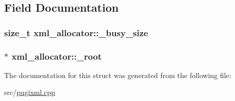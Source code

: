 \subsection{Field Documentation}
\hypertarget{structxml__allocator_a4908b4aaa8cbbc3bf936ab8a938053c0}{
\subsubsection[{\_\-busy\_\-size}]{\setlength{\rightskip}{0pt plus 5cm}size\_\-t {\bf xml\_\-allocator::\_\-busy\_\-size}}}
\label{structxml__allocator_a4908b4aaa8cbbc3bf936ab8a938053c0}
\hypertarget{structxml__allocator_a38082e85b23743620a257f997a00bb69}{
\subsubsection[{\_\-root}]{$\ast$ {\bf xml\_\-allocator::\_\-root}}}
\label{structxml__allocator_a38082e85b23743620a257f997a00bb69}


The documentation for this struct was generated from the following file:\begin{DoxyCompactItemize}
\item 
src/\hyperlink{pugixml_8cpp}{pugixml.cpp}\end{DoxyCompactItemize}
